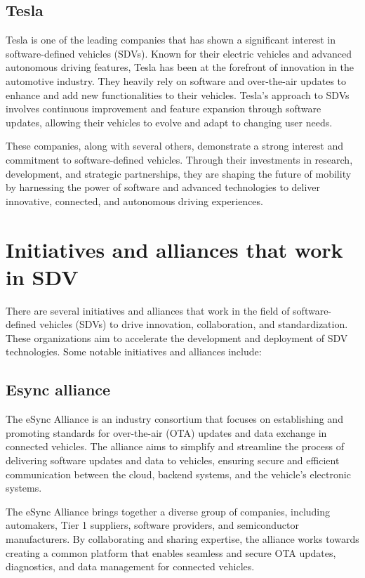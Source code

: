 \documentclass[
12pt,
oneside, 
onehalfspacing, 
nolistspacing, 
parskip, 
chapterinoneline, 
]{AASTCOMPUTER}
\begin{document}
\subsection{Tesla}
Tesla is one of the leading companies that has shown a significant interest in software-defined vehicles (SDVs). Known for their electric vehicles and advanced autonomous driving features, Tesla has been at the forefront of innovation in the automotive industry. They heavily rely on software and over-the-air updates to enhance and add new functionalities to their vehicles. Tesla's approach to SDVs involves continuous improvement and feature expansion through software updates, allowing their vehicles to evolve and adapt to changing user needs.

These companies, along with several others, demonstrate a strong interest and commitment to software-defined vehicles. Through their investments in research, development, and strategic partnerships, they are shaping the future of mobility by harnessing the power of software and advanced technologies to deliver innovative, connected, and autonomous driving experiences.
\newpage
\section{Initiatives and alliances that work in SDV}
There are several initiatives and alliances that work in the field of software-defined vehicles (SDVs) to drive innovation, collaboration, and standardization. These organizations aim to accelerate the development and deployment of SDV technologies. Some notable initiatives and alliances include:
\subsection{Esync alliance}
The eSync Alliance \cite{eSyncAlliance} is an industry consortium that focuses on establishing and promoting standards for over-the-air (OTA) updates and data exchange in connected vehicles. The alliance aims to simplify and streamline the process of delivering software updates and data to vehicles, ensuring secure and efficient communication between the cloud, backend systems, and the vehicle's electronic systems.

The eSync Alliance brings together a diverse group of companies, including automakers, Tier 1 suppliers, software providers, and semiconductor manufacturers. By collaborating and sharing expertise, the alliance works towards creating a common platform that enables seamless and secure OTA updates, diagnostics, and data management for connected vehicles.
\end{document}
